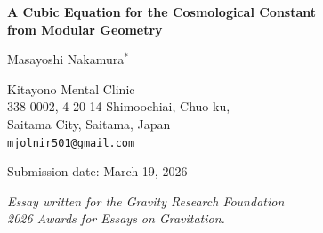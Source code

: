 \documentclass[12pt]{article}
\begin{document}
\begin{titlepage}
\centering
\vspace*{2cm}

{\LARGE\bfseries A Cubic Equation for the Cosmological Constant\\
from Modular Geometry}

\vspace{1.5cm}

{\large Masayoshi Nakamura$^{*}$}

\vspace{0.5cm}

{\normalsize
Kitayono Mental Clinic\\
338-0002, 4-20-14 Shimoochiai, Chuo-ku,\\
Saitama City, Saitama, Japan\\
\texttt{mjolnir501@gmail.com}
}

\vspace{1cm}

{\normalsize Submission date: March 19, 2026}

\vspace{1cm}

\textit{Essay written for the Gravity Research Foundation\\
2026 Awards for Essays on Gravitation.}

\vspace{2cm}

\begin{abstract}
\noindent
We propose that the cosmological constant emerges from a suppression law
determined by the modular geometry of $X(2)=\Gamma(2)\backslash\mathbb{H}$.
The \emph{strict kernel}---the unique root $k_{\mathrm{ker}}\approx0.6856$
of $12(1-k)^2(1+k)=2$, fixed by
$\mathrm{SU}(5)\to\mathrm{SU}(3)\times\mathrm{SU}(2)\times\mathrm{U}(1)$
in four dimensions---yields nome
$Q_{\mathrm{ker}}\approx1.568\times10^{-3}$.
The three vacuum scales of the bridge sector satisfy a cubic equation
whose smallest root is
$\Lambda_{\mathrm{eff}}\approx\Lambda_*^4\,Q_{\mathrm{ker}}^{20}
\approx2\times10^{-47}~\mathrm{GeV}^4$,
matching observation without fine-tuning.
The exponent $n_{\mathrm{exact}}\approx20.025\approx d\times N=4\times5$
($d=4$ spacetime dimensions, $N=5$ for $\mathrm{SU}(N)$)
is determined internally with no free parameters.
\end{abstract}

\end{titlepage}
\end{document}
